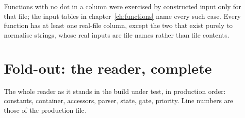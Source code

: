 \vspace{4mm}
Functions with no dot in a column were exercised by constructed input only for that file; the input
tables in chapter~\ref{ch:functions} name every such case. Every function has at least one real-file
column, except the two that exist purely to normalise strings, whose real inputs are file names
rather than file contents.

\chapter{Fold-out: the reader, complete}\label{app:source}

The whole reader as it stands in the build under test, in production order: constants, container,
accessors, parser, state, gate, priority. Line numbers are those of the production file.

